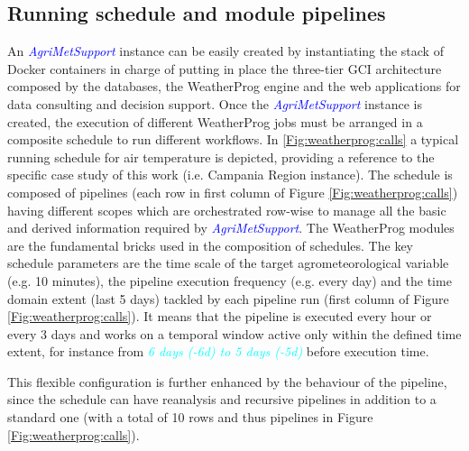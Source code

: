 \documentclass[authoryear,preprint,review,12pt]{elsarticle}
\newcommand{\update}[1]{\emph{\textcolor{blue}{#1}}}
\newcommand{\review}[1]{\emph{\textcolor{cyan}{#1}}}
\newcommand{\gci}{\update{AgriMetSupport}\xspace}
\begin{document}
\subsection{ Running schedule and module pipelines }
An \gci instance can be easily created by instantiating the stack of Docker containers in charge of putting in place the three-tier GCI architecture composed by the databases, the WeatherProg engine and the web applications for data consulting and decision support.
Once the \gci instance is created, the execution of different WeatherProg jobs must be arranged in a composite schedule to run %
different workflows.
In \cref{Fig:weatherprog:calls} a typical running schedule for air temperature is depicted, providing a reference to the specific case study of this work (i.e. Campania Region instance).
The schedule is composed of pipelines (each row in first column of Figure \ref{Fig:weatherprog:calls}) having different scopes which are orchestrated row-wise to manage all the basic and derived information required by \gci.
The WeatherProg modules are the fundamental bricks used in the composition of schedules.
The key schedule parameters are the time scale of the target agrometeorological variable (e.g. 10 minutes), the pipeline execution frequency (e.g. every day) and the time domain extent (last 5 days) tackled by each pipeline run (first column of Figure \ref{Fig:weatherprog:calls}).
It means that the pipeline is executed every hour or every 3 days and works on a temporal window active only within the defined time extent, for instance from \review{6 days (-6d) to 5 days (-5d)} before execution time.

This flexible configuration is further enhanced by the behaviour of the pipeline, since the schedule can have reanalysis and recursive pipelines in addition to a standard one (with a total of 10 rows and thus pipelines in Figure \ref{Fig:weatherprog:calls}).
\end{document}
